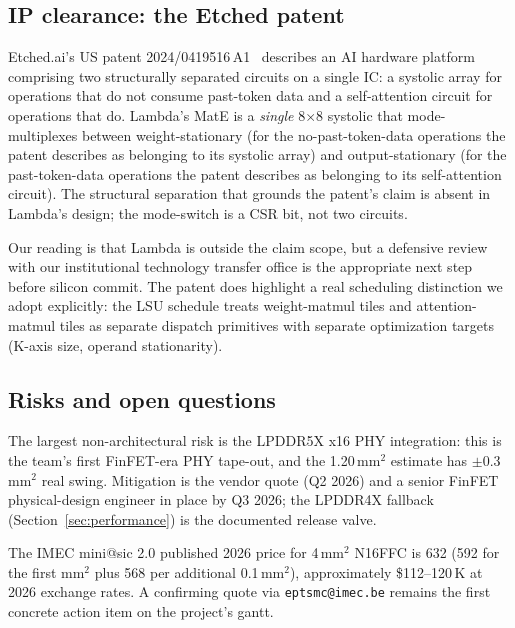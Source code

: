 \documentclass[conference]{IEEEtran}
\begin{document}
\subsection{IP clearance: the Etched patent}

Etched.ai's US patent 2024/0419516\,A1~\cite{etched_patent} describes an AI hardware platform comprising two structurally separated circuits on a single IC: a systolic array for operations that do not consume past-token data and a self-attention circuit for operations that do. Lambda's MatE is a \textit{single} 8$\times$8 systolic that mode-multiplexes between weight-stationary (for the no-past-token-data operations the patent describes as belonging to its systolic array) and output-stationary (for the past-token-data operations the patent describes as belonging to its self-attention circuit). The structural separation that grounds the patent's claim is absent in Lambda's design; the mode-switch is a CSR bit, not two circuits.

Our reading is that Lambda is outside the claim scope, but a defensive review with our institutional technology transfer office is the appropriate next step before silicon commit. The patent does highlight a real scheduling distinction we adopt explicitly: the LSU schedule treats weight-matmul tiles and attention-matmul tiles as separate dispatch primitives with separate optimization targets (K-axis size, operand stationarity).

\subsection{Risks and open questions}

The largest non-architectural risk is the LPDDR5X x16 PHY integration: this is the team's first FinFET-era PHY tape-out, and the 1.20\,mm$^2$ estimate has $\pm 0.3$\,mm$^2$ real swing. Mitigation is the vendor quote (Q2 2026) and a senior FinFET physical-design engineer in place by Q3 2026; the LPDDR4X fallback (Section~\ref{sec:performance}) is the documented release valve.

The IMEC mini@sic 2.0 published 2026 price for 4\,mm$^2$ N16FFC is 632 (592 for the first mm$^2$ plus 568 per additional 0.1\,mm$^2$), approximately \$112--120\,K at 2026 exchange rates. A confirming quote via \texttt{eptsmc@imec.be} remains the first concrete action item on the project's gantt.

\end{document}
